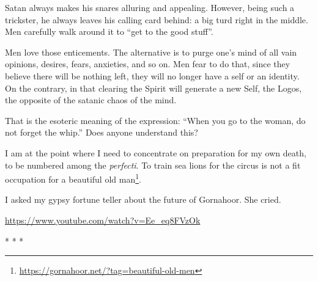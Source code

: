 Satan always makes his snares alluring and appealing. However, being such a trickster, he always leaves his calling card behind: a big turd right in the middle. Men carefully walk around it to ``get to the good stuff''.

Men love those enticements. The alternative is to purge one's mind of all vain opinions, desires, fears, anxieties, and so on. Men fear to do that, since they believe there will be nothing left, they will no longer have a self or an identity. On the contrary, in that clearing the Spirit will generate a new Self, the Logos, the opposite of the satanic chaos of the mind.

That is the esoteric meaning of the expression: ``When you go to the woman, do not forget the whip.'' Does anyone understand this?

I am at the point where I need to concentrate on preparation for my own death, to be numbered among the \emph{perfecti}. To train sea lions for the circus is not a fit occupation for a beautiful old man\footnote{\url{https://gornahoor.net/?tag=beautiful-old-men}}.

I asked my gypsy fortune teller about the future of Gornahoor. She cried.

\url{https://www.youtube.com/watch?v=Ee\_eq8FVzOk}


\begin{center}* * *\end{center}

